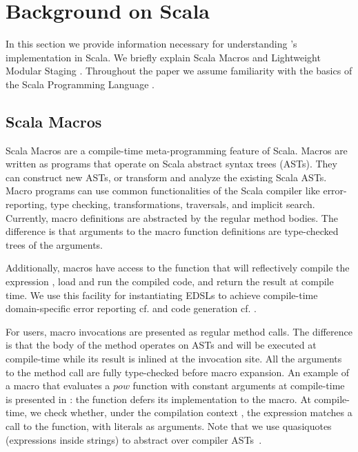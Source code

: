\documentclass[paper.tex]{subfiles}
\begin{document}
\section{Background on Scala}
\label{sec:background}

In this section we provide information necessary for understanding \tool's
implementation in Scala. We briefly explain Scala Macros
\cite{burmako_scala_2013} and Lightweight Modular Staging
\cite{rompf_lightweight_2012,rompf_optimizing_2013}.
Throughout the paper we assume familiarity with the basics of the
Scala Programming Language \cite{odersky_scala_2004}.

\subsection{Scala Macros}
\label{sec:scala-macros}

Scala Macros \cite{burmako_scala_2013} are a compile-time meta-programming
feature of Scala. Macros are written as programs that operate on Scala abstract syntax trees (ASTs). They can construct new ASTs, or transform and analyze the existing Scala ASTs. Macro programs can use common functionalities of the Scala compiler like error-reporting, type checking, transformations, traversals, and implicit search. Currently, macro definitions are abstracted by the regular method bodies. The difference is that arguments to the macro function definitions are type-checked trees of the arguments.

Additionally, macros have access to the  function that will reflectively compile the expression , load and run the compiled code, and return the result at compile time. We use this facility for instantiating EDSLs to achieve compile-time domain-specific error reporting cf.  and code generation cf. .

For users, macro invocations are presented as regular method calls. The
difference is that the body of the method operates on ASTs and will be
executed at compile-time while its result is inlined at the invocation site.
All the arguments to the method call are fully type-checked before macro
expansion. An example of a macro that evaluates a $pow$ function with constant
arguments at compile-time is presented in : the  function defers its implementation to the  macro. At compile-time, we check whether, under the compilation context , the expression matches a call to the  function, with literals as arguments. Note that we use quasiquotes (expressions inside  strings) to abstract over compiler ASTs~\cite{shabalin_quasiquotes_2013}.
\end{document}
